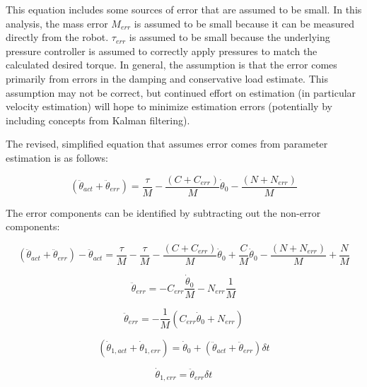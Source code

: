 This equation includes some sources of error that are assumed to be small. In 
this analysis, the mass error $M_{err}$ is assumed to be small because it can
be measured directly from the robot. $\tau_{err}$ is assumed to be small because
the underlying pressure controller is assumed to correctly apply pressures to
match the calculated desired torque. In general, the assumption is that the error
comes primarily from errors in the damping and conservative load estimate. This 
assumption may not be correct, but continued effort on estimation (in particular 
velocity estimation) will hope to minimize estimation errors (potentially by 
including concepts from Kalman filtering).

The revised, simplified equation that assumes error comes from parameter estimation is as follows:

\begin{equation}
(\ddot{\theta}_{act} + \ddot{\theta}_{err}) = \dfrac{\tau}{M} - \dfrac{(C + C_{err})}{M}\dot{\theta}_{0} - \dfrac{(N + N_{err})}{M}
\end{equation}

The error components can be identified by subtracting out the non-error 
components:

\begin{equation}
(\ddot{\theta}_{act} + \ddot{\theta}_{err}) - \ddot{\theta}_{act} =
\dfrac{\tau}{M} - \dfrac{\tau}{M}
- \dfrac{(C + C_{err})}{M}\dot{\theta}_{0} + \dfrac{C}{M}\dot{\theta}_{0}
- \dfrac{(N + N_{err})}{M}  + \dfrac{N}{M}
\end{equation}

\begin{equation}
\ddot{\theta}_{err} =
- C_{err} \dfrac{\dot{\theta}_{0}}{M}
- N_{err} \dfrac{1}{M}
\end{equation}

\begin{equation}
\ddot{\theta}_{err} = - \dfrac{1}{M}
(C_{err} \dot{\theta}_{0} + N_{err})
\end{equation}


\begin{equation}
(\dot{\theta}_{1, act} + \dot{\theta}_{1, err}) = \dot{\theta}_{0} + (\ddot{\theta}_{act} + \ddot{\theta}_{err}) \delta t
\end{equation}

\begin{equation}
\dot{\theta}_{1, err} = \ddot{\theta}_{err} \delta t
\end{equation}

